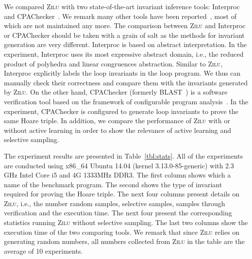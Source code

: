We compared \textsc{Zilu} with two state-of-the-art invariant inference tools: Interproc~\cite{jeannet2010interproc} and CPAChecker~\cite{beyer2011cpachecker}. We remark many other tools have been reported~\cite{}, most of which are not maintained any more. The comparison between \textsc{Zilu} and Interproc or CPAChecker should be taken with a grain of salt as the methods for invariant generation are very different. Interproc is based on abstract interpretation. In the experiment, Interproc uses its most expressive abstract domain, i.e., the reduced product of polyhedra and linear congruences abstraction. Similar to \textsc{Zilu}, Interproc explicitly labels the loop invariants in the loop program. We thus can manually check their correctness and compare them with the invariants generated by \textsc{Zilu}. On the other hand, CPAChecker (formerly BLAST~\cite{henzinger2003software}) is a software verification tool based on the framework of configurable program analysis~\cite{beyer2007configurable}. In the experiment, CPAChecker is configured to generate loop invariants to prove the same Hoare triple. In addition, we compare the performance of \textsc{Zilu} with or without active learning in order to show the relevance of active learning and selective sampling.

The experiment results are presented in Table~\ref{tbl:stats}. All of the experiments are conducted using x86\_64 Ubuntu 14.04 (kernel 3.13.0-85-generic) with 2.3 GHz Intel Core i5 and 4G 1333MHz DDR3.
The first column shows which a name of the benchmark program. The second shows the type of invariant required for proving the Hoare triple. The next four columns present details on \textsc{Zilu}, i.e., the number random samples, selective samples, samples through verification and the execution time. The next four present the corresponding statistics running \textsc{Zilu} without selective sampling. The last two columns show the execution time of the two comparing tools.  
We remark that since \textsc{Zilu} relies on generating random numbers, all numbers collected from \textsc{Zilu} in the table are the average of 10 experiments.

